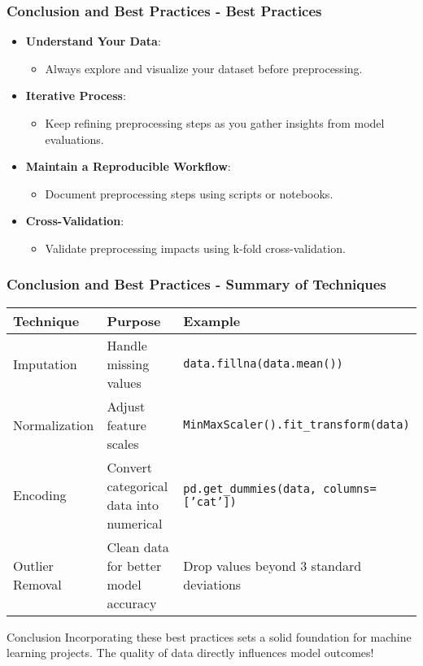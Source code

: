 \documentclass{beamer}
\begin{document}
\begin{frame}[fragile]
    \frametitle{Conclusion and Best Practices - Best Practices}
    \begin{itemize}
        \item \textbf{Understand Your Data}:
        \begin{itemize}
            \item Always explore and visualize your dataset before preprocessing. 
        \end{itemize}
        
        \item \textbf{Iterative Process}:
        \begin{itemize}
            \item Keep refining preprocessing steps as you gather insights from model evaluations.
        \end{itemize}
        
        \item \textbf{Maintain a Reproducible Workflow}:
        \begin{itemize}
            \item Document preprocessing steps using scripts or notebooks.
        \end{itemize}
        
        \item \textbf{Cross-Validation}:
        \begin{itemize}
            \item Validate preprocessing impacts using k-fold cross-validation.
        \end{itemize}
    \end{itemize}
\end{frame}

\begin{frame}[fragile]
    \frametitle{Conclusion and Best Practices - Summary of Techniques}
    \begin{tabular}{|l|l|l|}
        \hline
        \textbf{Technique} & \textbf{Purpose} & \textbf{Example} \\
        \hline
        Imputation & Handle missing values & \texttt{data.fillna(data.mean())} \\
        \hline
        Normalization & Adjust feature scales & \texttt{MinMaxScaler().fit\_transform(data)} \\
        \hline
        Encoding & Convert categorical data into numerical & \texttt{pd.get\_dummies(data, columns=['cat'])} \\
        \hline
        Outlier Removal & Clean data for better model accuracy & Drop values beyond 3 standard deviations \\
        \hline
    \end{tabular}
    
    \vspace{0.5cm}
    \begin{block}{Conclusion}
        Incorporating these best practices sets a solid foundation for machine learning projects. The quality of data directly influences model outcomes!
    \end{block}
\end{frame}
\end{document}

